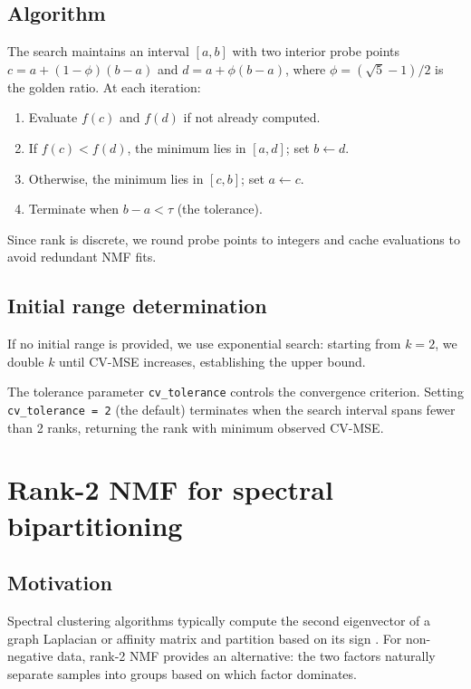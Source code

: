 \documentclass[11pt]{article}
\newcommand{\code}[1]{\texttt{#1}}
\begin{document}
\subsection{Algorithm}

The search maintains an interval $[a, b]$ with two interior probe points 
$c = a + (1-\phi)(b-a)$ and $d = a + \phi(b-a)$, where $\phi = (\sqrt{5}-1)/2$ 
is the golden ratio. At each iteration:

\begin{enumerate}
  \item Evaluate $f(c)$ and $f(d)$ if not already computed.
  \item If $f(c) < f(d)$, the minimum lies in $[a, d]$; set $b \leftarrow d$.
  \item Otherwise, the minimum lies in $[c, b]$; set $a \leftarrow c$.
  \item Terminate when $b - a < \tau$ (the tolerance).
\end{enumerate}

Since rank is discrete, we round probe points to integers and cache evaluations 
to avoid redundant NMF fits.

\subsection{Initial range determination}

If no initial range is provided, we use exponential search: starting from 
$k = 2$, we double $k$ until CV-MSE increases, establishing the upper bound.

The tolerance parameter \code{cv\_tolerance} controls the convergence criterion. 
Setting \code{cv\_tolerance = 2} (the default) terminates when the search 
interval spans fewer than 2 ranks, returning the rank with minimum observed 
CV-MSE.


\section{Rank-2 NMF for spectral bipartitioning} \label{sec:bipartition}

\subsection{Motivation}

Spectral clustering algorithms typically compute the second eigenvector of a 
graph Laplacian or affinity matrix and partition based on its sign 
\citep{Shi2000}. For non-negative data, rank-2 NMF provides an alternative: the 
two factors naturally separate samples into groups based on which factor 
dominates.
\end{document}
